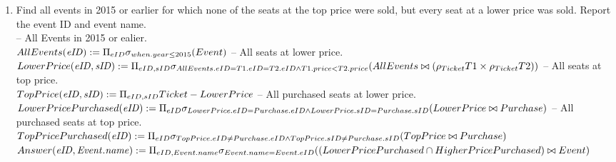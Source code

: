 \documentclass{article}
\newcommand{\var}[1]{\mathit{#1}}
\begin{document}
\begin{enumerate}
\item   %
Find all events in 2015 or earlier
for which none of the seats at the top price were sold,
but every seat at a lower price was sold.
Report the event ID and event name.\\
-- All Events in 2015 or ealier. \\[5pt]
{ \large
$
AllEvents(\var{eID}) := 
	\Pi_{eID} 
	\sigma_{
		when.year \leq 2015
		}
	(Event) \\[10pt]
$
}
-- All seats at lower price. \\[5pt]
{ \large
$
LowerPrice(\var{eID, sID}) := 
	\Pi_{eID, sID} 
	\sigma_{
		AllEvents.eID=T1.eID=T2.eID \wedge
		T1.price < T2.price
		}\\
	(AllEvents \bowtie (\rho_{Ticket}T1 \times \rho_{Ticket}T2)) \\[10pt]
$
}
-- All seats at top price. \\[5pt]
{ \large
$
TopPrice(\var{eID, sID}) := 
	\Pi_{eID, sID} 
	Ticket - LowerPrice \\[10pt]
$
}
-- All purchased seats at lower price. \\[5pt]
{ \large
$
LowerPricePurchased(\var{eID}) := 
	\Pi_{eID} 
	\sigma_{
		LowerPrice.eID=Purchase.eID \wedge
		LowerPrice.sID=Purchase.sID }\\
	(LowerPrice \bowtie Purchase) \\[10pt]
$
}
-- All purchased seats at top price. \\[5pt]
{ \large
$
TopPricePurchased(\var{eID}) := 
	\Pi_{eID} 
	\sigma_{
		TopPrice.eID \neq Purchase.eID \wedge
		TopPrice.sID \neq Purchase.sID }\\
	(TopPrice \bowtie Purchase) \\[10pt]
$
$
Answer(\var{eID, Event.name}) := 
	\Pi_{eID, Event.name} 
	\sigma_{
		Event.name=Event.eID }\\
	((LowerPricePurchased \cap HigherPricePurchased) \bowtie Event) \\[10pt]
$
}


\end{enumerate}
\end{document}
